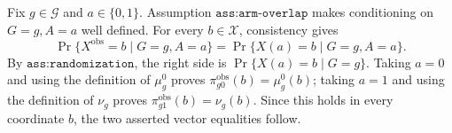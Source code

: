 Fix \(g\in\mathcal G\) and \(a\in\{0,1\}\).  Assumption \(\texttt{ass:arm-overlap}\) makes conditioning on \(G=g,A=a\) well defined.  For every \(b\in\mathcal X\), consistency gives
\[
 \Pr\{X^{\mathrm{obs}}=b\mid G=g,A=a\}
 =\Pr\{X(a)=b\mid G=g,A=a\}.
\]
By \(\texttt{ass:randomization}\), the right side is
\(\Pr\{X(a)=b\mid G=g\}\).  Taking \(a=0\) and using the definition of \(\mu_g^0\) proves \(\pi_{g0}^{\mathrm{obs}}(b)=\mu_g^0(b)\); taking \(a=1\) and using the definition of \(\nu_g\) proves \(\pi_{g1}^{\mathrm{obs}}(b)=\nu_g(b)\).  Since this holds in every coordinate \(b\), the two asserted vector equalities follow.